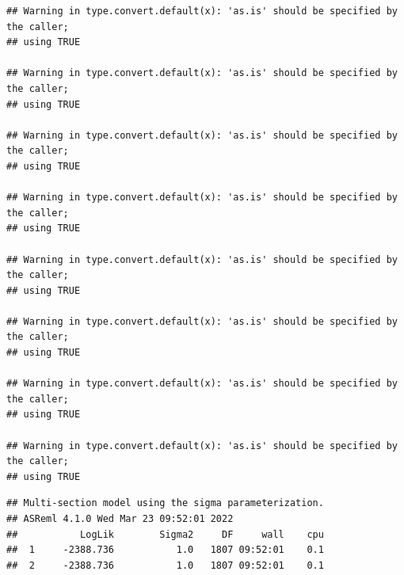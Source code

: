 \documentclass[
  12pt,
]{book}
\newenvironment{Shaded}{\begin{snugshade}}{\end{snugshade}}
\newcommand{\KeywordTok}[1]{\textcolor[rgb]{0.13,0.29,0.53}{\textbf{#1}}}
\newcommand{\NormalTok}[1]{#1}
\newcommand{\OperatorTok}[1]{\textcolor[rgb]{0.81,0.36,0.00}{\textbf{#1}}}
\begin{document}
\begin{verbatim}
## Warning in type.convert.default(x): 'as.is' should be specified by the caller;
## using TRUE

## Warning in type.convert.default(x): 'as.is' should be specified by the caller;
## using TRUE

## Warning in type.convert.default(x): 'as.is' should be specified by the caller;
## using TRUE

## Warning in type.convert.default(x): 'as.is' should be specified by the caller;
## using TRUE

## Warning in type.convert.default(x): 'as.is' should be specified by the caller;
## using TRUE

## Warning in type.convert.default(x): 'as.is' should be specified by the caller;
## using TRUE

## Warning in type.convert.default(x): 'as.is' should be specified by the caller;
## using TRUE

## Warning in type.convert.default(x): 'as.is' should be specified by the caller;
## using TRUE
\end{verbatim}

\begin{verbatim}
## Multi-section model using the sigma parameterization.
## ASReml 4.1.0 Wed Mar 23 09:52:01 2022
##           LogLik        Sigma2     DF     wall    cpu
##  1     -2388.736           1.0   1807 09:52:01    0.1
##  2     -2388.736           1.0   1807 09:52:01    0.1
\end{verbatim}

\begin{Shaded}
\end{Shaded}
\end{document}

